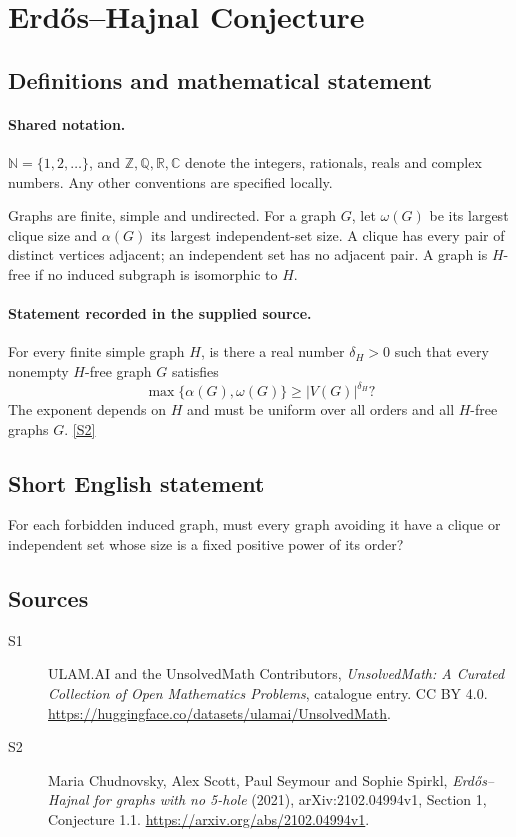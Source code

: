 \documentclass[11pt]{article}
\newcommand{\sref}[2]{\hyperlink{source:#1:#2}{[S#2]}}
\begin{document}
\section{Erdős–Hajnal Conjecture}\label{statement}

\subsection{Definitions and mathematical statement}

\paragraph{Shared notation.}$\mathbb N=\{1,2,\ldots\}$, and $\mathbb Z,\mathbb Q,\mathbb R,\mathbb C$ denote the integers, rationals, reals and complex numbers. Any other conventions are specified locally.


Graphs are finite, simple and undirected. For a graph $G$, let $\omega(G)$ be its largest clique size and $\alpha(G)$ its largest independent-set size. A clique has every pair of distinct vertices adjacent; an independent set has no adjacent pair. A graph is $H$-free if no induced subgraph is isomorphic to $H$.
\paragraph{Statement recorded in the supplied source.}
For every finite simple graph $H$, is there a real number $\delta_H>0$ such that every nonempty $H$-free graph $G$ satisfies
\[
 \max\{\alpha(G),\omega(G)\}\ge |V(G)|^{\delta_H}?
\]
The exponent depends on $H$ and must be uniform over all orders and all $H$-free graphs $G$. \sref{statement}{2}
\subsection{Short English statement}
For each forbidden induced graph, must every graph avoiding it have a clique or independent set whose size is a fixed positive power of its order?
\subsection{Sources}
\begin{description}
\item[\hypertarget{source:statement:1}{S1}] ULAM.AI and the UnsolvedMath Contributors, \emph{UnsolvedMath: A Curated Collection of Open Mathematics Problems}, catalogue entry. CC BY 4.0. \url{https://huggingface.co/datasets/ulamai/UnsolvedMath}.
\item[\hypertarget{source:statement:2}{S2}] Maria Chudnovsky, Alex Scott, Paul Seymour and Sophie Spirkl, \emph{Erdős--Hajnal for graphs with no 5-hole} (2021), arXiv:2102.04994v1, Section 1, Conjecture 1.1. \url{https://arxiv.org/abs/2102.04994v1}.
\end{description}
\label{end:statement}
\end{document}

